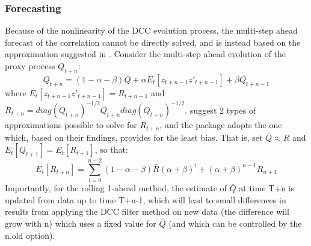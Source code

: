 \subsubsection{Forecasting}
Because of the nonlinearity of the DCC evolution process, the multi-step ahead
forecast of the correlation cannot be directly solved, and is instead based on the
approximation suggested in \cite{Engle2001}. Consider the multi-step ahead
evolution of the proxy process $Q_{t+n}$:
\begin{equation}
{Q_{t + n}} = \left( {1 - \alpha  - \beta } \right)\bar Q + \alpha {E_t}\left[ {{z_{t + n - 1}}{{z'}_{t + n - 1}}} \right] + \beta {Q_{t + n - 1}}
\end{equation}
where ${E_t}\left[ {{z_{t + n - 1}}{{z'}_{t + n - 1}}} \right] = {R_{t + n - 1}}$ and
${R_{t + n}} = diag{\left( {{Q_{t + n}}} \right)^{ - 1/2}}{Q_{t + n}}diag{\left( {{Q_{t + n}}} \right)^{ - 1/2}}$.
\cite{Engle2001} suggest 2 types of approximations possible to solve for $R_{t+n}$,
and the package adopts the one which, based on their findings, provides for the
least bias. That is, set $\bar Q \approx R$ and ${E_t}\left[ {{Q_{t + 1}}} \right] = {E_t}\left[ {{R_{t + 1}}} \right]$,
so that:
\begin{equation}
{E_t}\left[ {{R_{t + n}}} \right] = \sum\limits_{i = 0}^{n - 2} {\left( {1 - \alpha  - \beta } \right)\bar R{{\left( {\alpha  + \beta } \right)}^i} + {{\left( {\alpha  + \beta } \right)}^{n - 1}}{R_{n + 1}}}
\end{equation}
Importantly, for the rolling 1-ahead method, the estimate of $\bar Q$ at time T+n
is updated from data up to time T+n-1, which will lead to small differences in
results from applying the DCC filter method on new data (the difference will grow with n)
which uses a fixed value for $\bar Q$ (and which can be controlled by the n.old option).
